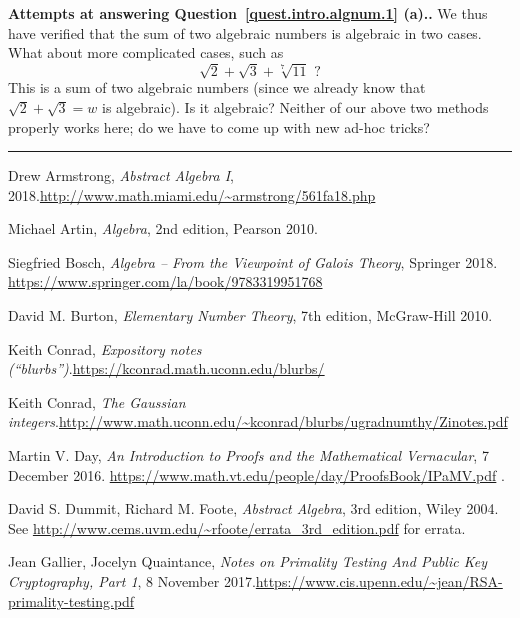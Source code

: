 \documentclass[numbers=enddot,12pt,final,onecolumn,notitlepage]{scrartcl}%
\numberwithin{exer}{section}
\theoremstyle{definition}
\newenvironment{proof}[1][Proof]{\noindent\textbf{#1.} }{\ \rule{0.5em}{0.5em}}
\begin{document}
\begin{proof}[Attempts at answering Question~\ref{quest.intro.algnum.1} \textbf{(a)}.]
We thus have verified that the sum of two algebraic numbers is algebraic
in two cases.
What about more complicated cases, such as
\[
\sqrt{2}+\sqrt{3}+\sqrt[7]{11} \text{ ?}
\]
This is a sum of two algebraic numbers (since we already know that
$\sqrt{2}+\sqrt{3} = w$ is algebraic). Is it algebraic?
Neither of our above two methods properly works here; do we have to
come up with new ad-hoc tricks?
\end{proof}

\begin{thebibliography}{99999999}                                                                                         %
Drew Armstrong, \textit{Abstract Algebra I},
2018.\newline\url{http://www.math.miami.edu/~armstrong/561fa18.php}

Michael Artin, \textit{Algebra},
2nd edition, Pearson 2010.

Siegfried Bosch, \textit{Algebra --
From the Viewpoint of Galois Theory},
Springer 2018.
\newline \url{https://www.springer.com/la/book/9783319951768}

David M. Burton,
\textit{Elementary Number Theory}, 7th edition, McGraw-Hill 2010.

Keith Conrad, \textit{Expository notes
(\textquotedblleft blurbs\textquotedblright)}.\newline\url{https://kconrad.math.uconn.edu/blurbs/}

Keith Conrad, \textit{The Gaussian
integers}.\newline\url{http://www.math.uconn.edu/~kconrad/blurbs/ugradnumthy/Zinotes.pdf}

Martin V. Day, \textit{An Introduction to Proofs and the
Mathematical Vernacular}, 7 December 2016.\newline%
\url{https://www.math.vt.edu/people/day/ProofsBook/IPaMV.pdf} .

David S. Dummit, Richard M. Foote,
\textit{Abstract Algebra}, 3rd edition, Wiley 2004. \newline
See \url{http://www.cems.uvm.edu/~rfoote/errata_3rd_edition.pdf} for errata.

Jean Gallier, Jocelyn Quaintance, \textit{Notes
on Primality Testing And Public Key Cryptography, Part 1}, 8 November
2017.\newline\url{https://www.cis.upenn.edu/~jean/RSA-primality-testing.pdf}


\end{thebibliography}
\end{document}
